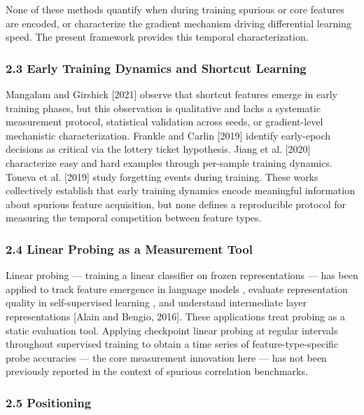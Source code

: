 None of these methods quantify when during training spurious or core features are encoded, or characterize the gradient mechanism driving differential learning speed. The present framework provides this temporal characterization.

\subsubsection{2.3 Early Training Dynamics and Shortcut Learning}

Mangalam and Girshick [2021] observe that shortcut features emerge in early training phases, but this observation is qualitative and lacks a systematic measurement protocol, statistical validation across seeds, or gradient-level mechanistic characterization. Frankle and Carlin [2019] identify early-epoch decisions as critical via the lottery ticket hypothesis. Jiang et al. [2020] characterize easy and hard examples through per-sample training dynamics. Toneva et al. [2019] study forgetting events during training. These works collectively establish that early training dynamics encode meaningful information about spurious feature acquisition, but none defines a reproducible protocol for measuring the temporal competition between feature types.

\subsubsection{2.4 Linear Probing as a Measurement Tool}

Linear probing — training a linear classifier on frozen representations — has been applied to track feature emergence in language models \citep{Tenneyetal2019}, evaluate representation quality in self-supervised learning \citep{Chenetal2020}, and understand intermediate layer representations [Alain and Bengio, 2016]. These applications treat probing as a static evaluation tool. Applying checkpoint linear probing at regular intervals throughout supervised training to obtain a time series of feature-type-specific probe accuracies — the core measurement innovation here — has not been previously reported in the context of spurious correlation benchmarks.

\subsubsection{2.5 Positioning}

